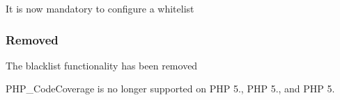 \begin{DoxyItemize}
\item It is now mandatory to configure a whitelist
\end{DoxyItemize}

\subsubsection*{Removed}


\begin{DoxyItemize}
\item The blacklist functionality has been removed
\item P\+H\+P\+\_\+\+Code\+Coverage is no longer supported on P\+HP 5., P\+HP 5., and P\+HP 5. 
\end{DoxyItemize}